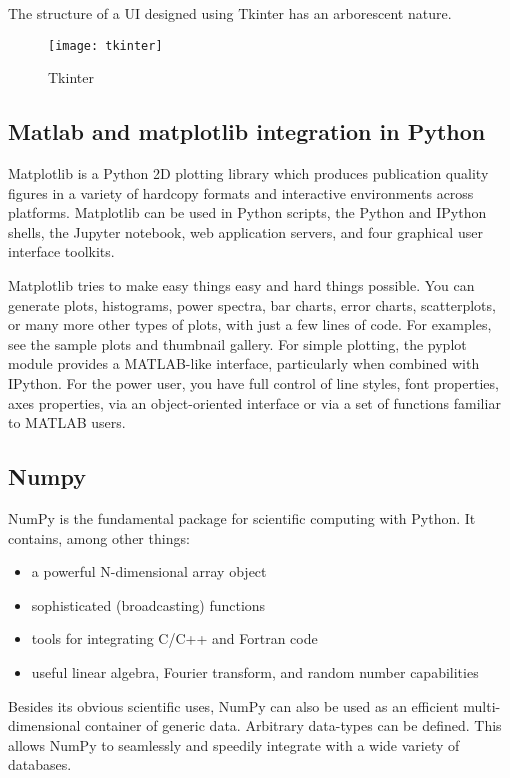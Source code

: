 \documentclass[12pt]{report}
\begin{document}
The structure of a UI designed using Tkinter has an arborescent nature.

\begin{figure}[h!]
\centering
\texttt{[image: tkinter]}
\caption{Tkinter}
\label{fig:tkinter}
\end{figure}

\subsection{Matlab and matplotlib integration in Python}
Matplotlib is a Python 2D plotting library which produces publication quality figures in a variety of hardcopy formats and interactive environments across platforms. Matplotlib can be used in Python scripts, the Python and IPython shells, the Jupyter notebook, web application servers, and four graphical user interface toolkits.

Matplotlib tries to make easy things easy and hard things possible. You can generate plots, histograms, power spectra, bar charts, error charts, scatterplots, or many more other types of plots, with just a few lines of code. For examples, see the sample plots and thumbnail gallery.
For simple plotting, the pyplot module provides a MATLAB-like interface, particularly when combined with IPython. For the power user, you have full control of line styles, font properties, axes properties, via an object-oriented interface or via a set of functions familiar to MATLAB users.


\subsection{Numpy}
NumPy is the fundamental package for scientific computing with Python. It contains, among other things:
\begin{itemize}
  \item a powerful N-dimensional array object
  \item sophisticated (broadcasting) functions
  \item tools for integrating C/C++ and Fortran code
  \item useful linear algebra, Fourier transform, and random number capabilities
\end{itemize}
Besides its obvious scientific uses, NumPy can also be used as an efficient multi-dimensional container of generic data. Arbitrary data-types can be defined. This allows NumPy to seamlessly and speedily integrate with a wide variety of databases.
\end{document}
